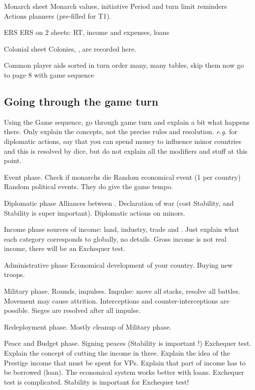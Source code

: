 \aparag Monarch sheet
\bparag Monarch values, initiative
\bparag Period and turn limit reminders
\bparag Actions planners (pre-filled for T1).

\aparag ERS
 ERS on 2 sheets: RT, income and expenses, loans

\aparag Colonial sheet
\bparag Colonies, \TP, \TradeFLEET are recorded here.

\aparag Common player aids
\bparag sorted in turn order
\bparag many, many tables, skip them now
\bparag go to page 8 with game sequence

\subsection{Going through the game turn}
\aparag Using the Game sequence, go through game turn and explain a bit what
happens there.
\bparag Only explain the concepts, not the precise rules and resolution.
\bparag \emph{e.g.} for diplomatic actions, say that you can spend money to
influence minor countries and this is resolved by dice, but do not explain all
the modifiers and stuff at this point.

\aparag Event phase.
\bparag Check if monarchs die
\bparag Random economical event (1 per country)
\bparag Random political events. They do give the game tempo.

\aparag Diplomatic phase
\bparag Alliances between \MAJ.
\bparag Declaration of war (cost Stability, and Stability is super important).
\bparag Diplomatic actions on minors.

\aparag Income phase
 sources of income: land, industry, trade and \ROTW.
\bparag Just explain what each category corresponds to globally, no details.
\bparag Gross income is not real income, there will be an Exchequer test.

\aparag Administrative phase
\bparag Economical development of your country.
\bparag Buying new troops.

\aparag Military phase.
\bparag Rounds, impulses.
\bparag Impulse: move all stacks, resolve all battles.
\bparag Movement may cause attrition.
\bparag Interceptions and counter-interceptions are possible.
\bparag Sieges are resolved after all impulse.

\aparag Redeployment phase.
\bparag Mostly cleanup of Military phase.

\aparag Peace and Budget phase.
\bparag Signing peaces (Stability is important !)
\bparag Exchequer test.
\bparag Explain the concept of cutting the income in three.
\bparag Explain the idea of the Prestige income that must be spent for VPs.
\bparag Explain that part of income has to be borrowed (loan).
\bparag The economical system works better with loans.
\bparag Exchequer test is complicated.
\bparag Stability is important for Exchequer test!

